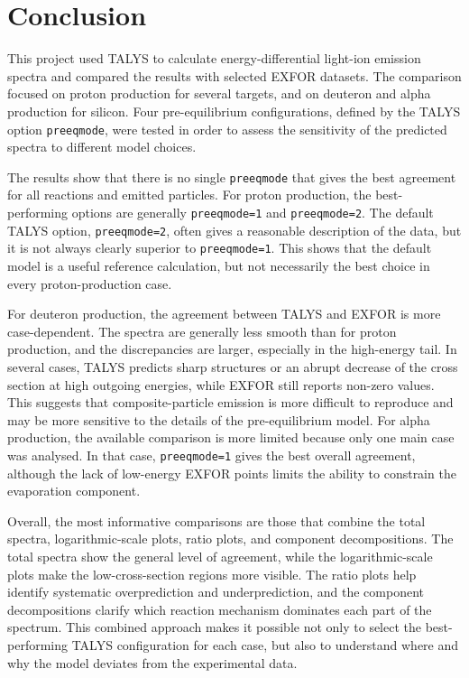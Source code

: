 \section{Conclusion}

This project used TALYS to calculate energy-differential light-ion emission spectra and compared the results with selected EXFOR datasets. The comparison focused on proton production for several targets, and on deuteron and alpha production for silicon. Four pre-equilibrium configurations, defined by the TALYS option \texttt{preeqmode}, were tested in order to assess the sensitivity of the predicted spectra to different model choices.

The results show that there is no single \texttt{preeqmode} that gives the best agreement for all reactions and emitted particles. For proton production, the best-performing options are generally \texttt{preeqmode=1} and \texttt{preeqmode=2}. The default TALYS option, \texttt{preeqmode=2}, often gives a reasonable description of the data, but it is not always clearly superior to \texttt{preeqmode=1}. This shows that the default model is a useful reference calculation, but not necessarily the best choice in every proton-production case.

For deuteron production, the agreement between TALYS and EXFOR is more case-dependent. The spectra are generally less smooth than for proton production, and the discrepancies are larger, especially in the high-energy tail. In several cases, TALYS predicts sharp structures or an abrupt decrease of the cross section at high outgoing energies, while EXFOR still reports non-zero values. This suggests that composite-particle emission is more difficult to reproduce and may be more sensitive to the details of the pre-equilibrium model. For alpha production, the available comparison is more limited because only one main case was analysed. In that case, \texttt{preeqmode=1} gives the best overall agreement, although the lack of low-energy EXFOR points limits the ability to constrain the evaporation component.

Overall, the most informative comparisons are those that combine the total spectra, logarithmic-scale plots, ratio plots, and component decompositions. The total spectra show the general level of agreement, while the logarithmic-scale plots make the low-cross-section regions more visible. The ratio plots help identify systematic overprediction and underprediction, and the component decompositions clarify which reaction mechanism dominates each part of the spectrum. This combined approach makes it possible not only to select the best-performing TALYS configuration for each case, but also to understand where and why the model deviates from the experimental data.
